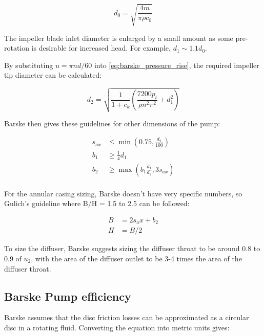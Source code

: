 \begin{equation}
    d_0 = \sqrt{\frac{4\dot{m}}{\pi \rho c_0}}
    \label{eq:barske_inlet_diameter}
\end{equation}

The impeller blade inlet diameter is enlarged by a small amount as some pre-rotation is desirable for increased head. For example, $d_1\sim1.1d_0$.

By substituting $u=\pi n d / 60$ into \cref{eq:barske_pressure_rise}, the required impeller tip diameter can be calculated:

\begin{equation}
    d_2 = \sqrt{\frac{1}{1+c_k}\left(\frac{7200p_t}{\rho n^2\pi^2} + d_1^2\right)}
    \label{eq:barske_tip_diameter}
\end{equation}

Barske then gives these guidelines for other dimensions of the pump:

\begin{align}
    s_{ax} & \leq \min{\left(0.75, \frac{d_2}{100}\right)} \\
    b_1 & \geq \frac{1}{4} d_1 \\ %
    b_2 & \geq \max{\left(b_1 \frac{d_1}{d_2}, 3s_{ax}\right)} \\
\end{align}

For the annular casing sizing, Barske doesn't have very specific numbers, so Gulich's guideline where B/H = 1.5 to 2.5 can be followed:

\begin{align}
    B & = 2 s_ax + b_2 \\
    H & = B / 2
\end{align}


To size the diffuser, Barske suggests sizing the diffuser throat to be around 0.8 to 0.9 of $u_2$, with the area of the diffuser outlet to be 3-4 times the area of the diffuser throat.

\subsection{Barske Pump efficiency}

Barske assumes that the disc friction losses can be approximated as a circular disc in a rotating fluid. Converting the equation into metric units gives:

